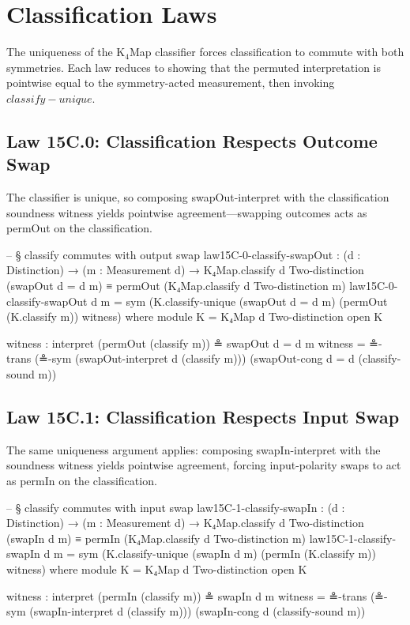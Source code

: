 \documentclass[11pt,a4paper]{book}
\def\texttt#1{#1}%
\begin{document}
\section{Classification Laws}

The uniqueness of the K$_4$Map classifier forces classification to commute
with both symmetries.  Each law reduces to showing that the permuted
interpretation is pointwise equal to the symmetry-acted measurement, then
invoking $\texttt{classify-unique}$.

\subsection{Law 15C.0: Classification Respects Outcome Swap}

The classifier is unique, so composing \texttt{swapOut-interpret} with the classification soundness witness yields pointwise agreement---swapping outcomes acts as \texttt{permOut} on the classification.

\begin{code}
-- § classify commutes with output swap
law15C-0-classify-swapOut :
  (d : Distinction) →
  (m : Measurement d) →
  K₄Map.classify d Two-distinction (swapOut {d = d} m)
  ≡ permOut (K₄Map.classify d Two-distinction m)
law15C-0-classify-swapOut d m =
  sym
    (K.classify-unique
      (swapOut {d = d} m)
      (permOut (K.classify m))
      witness)
  where
    module K = K₄Map d Two-distinction
    open K

    witness : interpret (permOut (classify m)) ≗ swapOut {d = d} m
    witness =
      ≗-trans
        (≗-sym (swapOut-interpret d (classify m)))
          (swapOut-cong {d = d} (classify-sound m))
\end{code}

\subsection{Law 15C.1: Classification Respects Input Swap}

The same uniqueness argument applies: composing \texttt{swapIn-interpret} with the soundness witness yields pointwise agreement, forcing input-polarity swaps to act as \texttt{permIn} on the classification.

\begin{code}
-- § classify commutes with input swap
law15C-1-classify-swapIn :
  (d : Distinction) →
  (m : Measurement d) →
  K₄Map.classify d Two-distinction (swapIn d m)
  ≡ permIn (K₄Map.classify d Two-distinction m)
law15C-1-classify-swapIn d m =
  sym
    (K.classify-unique
      (swapIn d m)
      (permIn (K.classify m))
      witness)
  where
    module K = K₄Map d Two-distinction
    open K

    witness : interpret (permIn (classify m)) ≗ swapIn d m
    witness =
      ≗-trans
        (≗-sym (swapIn-interpret d (classify m)))
        (swapIn-cong d (classify-sound m))
\end{code}
\end{document}
